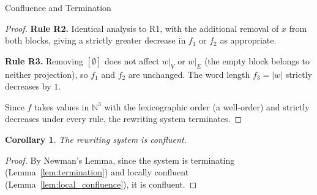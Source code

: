 \documentclass{article}
\newtheorem{corollary}[theorem]{Corollary}
\theoremstyle{definition}
\theoremstyle{remark}
\theoremstyle{theorem}
\theoremstyle{definition}
\begin{document}
\begin{section}{Confluence and Termination}
\begin{proof}
\medskip
\noindent\textbf{Rule R2.}
Identical analysis to R1, with the additional removal of $x$ from both
blocks, giving a strictly greater decrease in $f_1$ or $f_2$ as
appropriate.

\medskip
\noindent\textbf{Rule R3.}
Removing $[\emptyset]$ does not affect $w|_V$ or $w|_E$ (the empty
block belongs to neither projection), so $f_1$ and $f_2$ are unchanged.
The word length $f_3 = |w|$ strictly decreases by $1$.

\medskip
\noindent Since $f$ takes values in $\mathbb{N}^3$ with the
lexicographic order (a well-order) and strictly decreases under every
rule, the rewriting system terminates.
\end{proof}

\begin{corollary}\label{cor:confluence}
The rewriting system is confluent.
\end{corollary}
\begin{proof}
By Newman's Lemma, since the system is terminating (Lemma~\ref{lem:termination}) and locally confluent (Lemma~\ref{lem:local_confluence}), it is confluent.
\end{proof}

\end{section}
\end{document}
